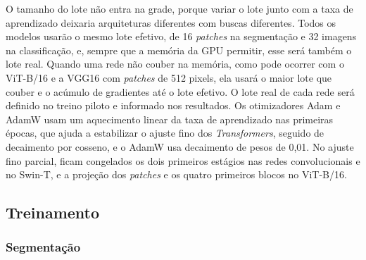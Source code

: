 \begin{table}[H]
	\caption{\label{tab:grid-search} Espaço de busca de hiperparâmetros}%
\end{table}

O tamanho do lote não entra na grade, porque variar o lote junto com a taxa de aprendizado deixaria arquiteturas diferentes com buscas diferentes. Todos os modelos usarão o mesmo lote efetivo, de 16 \textit{patches} na segmentação e 32 imagens na classificação, e, sempre que a memória da GPU permitir, esse será também o lote real. Quando uma rede não couber na memória, como pode ocorrer com o ViT-B/16 e a VGG16 com \textit{patches} de 512 pixels, ela usará o maior lote que couber e o acúmulo de gradientes até o lote efetivo. O lote real de cada rede será definido no treino piloto e informado nos resultados. Os otimizadores Adam \cite{kingma2015adam} e AdamW \cite{loshchilov2019adamw} usam um aquecimento linear da taxa de aprendizado nas primeiras épocas, que ajuda a estabilizar o ajuste fino dos \textit{Transformers}, seguido de decaimento por cosseno, e o AdamW usa decaimento de pesos de 0,01. No ajuste fino parcial, ficam congelados os dois primeiros estágios nas redes convolucionais e no Swin-T, e a projeção dos \textit{patches} e os quatro primeiros blocos no ViT-B/16.

\subsection{Treinamento}
\label{sec:protocolo-treino}

\subsubsection{Segmentação}
\label{sec:protocolo-seg}

